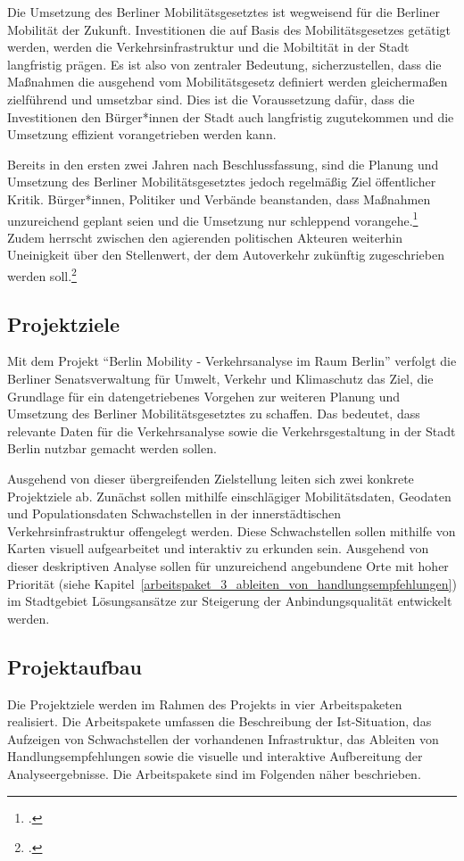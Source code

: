 Die Umsetzung des Berliner Mobilitätsgesetztes ist wegweisend für die Berliner Mobilität der Zukunft. Investitionen die auf Basis des Mobilitätsgesetzes getätigt werden, werden die Verkehrsinfrastruktur und die Mobiltität in der Stadt langfristig prägen. Es ist also von zentraler Bedeutung, sicherzustellen, dass die Maßnahmen die ausgehend vom Mobilitätsgesetz definiert werden gleichermaßen zielführend und umsetzbar sind. Dies ist die Voraussetzung dafür, dass die Investitionen den Bürger*innen der Stadt auch langfristig zugutekommen und die Umsetzung effizient vorangetrieben werden kann.

Bereits in den ersten zwei Jahren nach Beschlussfassung, sind die Planung und Umsetzung des Berliner Mobilitätsgesetztes jedoch regelmäßig Ziel öffentlicher Kritik. Bürger*innen, Politiker und Verbände beanstanden, dass Maßnahmen unzureichend geplant seien und die Umsetzung nur schleppend vorangehe.\footcite{Tagesspiegel.2019} Zudem herrscht zwischen den agierenden politischen Akteuren weiterhin Uneinigkeit über den Stellenwert, der dem Autoverkehr zukünftig zugeschrieben werden soll.\footcite{Tagesspiegel.2020}

\subsection{Projektziele}
Mit dem Projekt \enquote{Berlin Mobility - Verkehrsanalyse im Raum Berlin} verfolgt die Berliner Senatsverwaltung für Umwelt, Verkehr und Klimaschutz das Ziel, die Grundlage für ein datengetriebenes Vorgehen zur weiteren Planung und Umsetzung des Berliner Mobilitätsgesetztes zu schaffen. Das bedeutet, dass relevante Daten für die Verkehrsanalyse sowie die Verkehrsgestaltung in der Stadt Berlin nutzbar gemacht werden sollen.

Ausgehend von dieser übergreifenden Zielstellung leiten sich zwei konkrete Projektziele ab. Zunächst sollen mithilfe einschlägiger Mobilitätsdaten, Geodaten und Populationsdaten Schwachstellen in der innerstädtischen Verkehrsinfrastruktur offengelegt werden. Diese Schwachstellen sollen mithilfe von Karten visuell aufgearbeitet und interaktiv zu erkunden sein. Ausgehend von dieser deskriptiven Analyse sollen für unzureichend angebundene Orte mit hoher Priorität (siehe Kapitel~\ref{arbeitspaket_3_ableiten_von_handlungsempfehlungen}) im Stadtgebiet Lösungsansätze zur Steigerung der Anbindungsqualität entwickelt werden.

\subsection{Projektaufbau}
Die Projektziele werden im Rahmen des Projekts in vier Arbeitspaketen realisiert. Die Arbeitspakete umfassen die Beschreibung der Ist-Situation, das Aufzeigen von Schwachstellen der vorhandenen Infrastruktur, das Ableiten von Handlungsempfehlungen sowie die visuelle und interaktive Aufbereitung der Analyseergebnisse. Die Arbeitspakete sind im Folgenden näher beschrieben.

